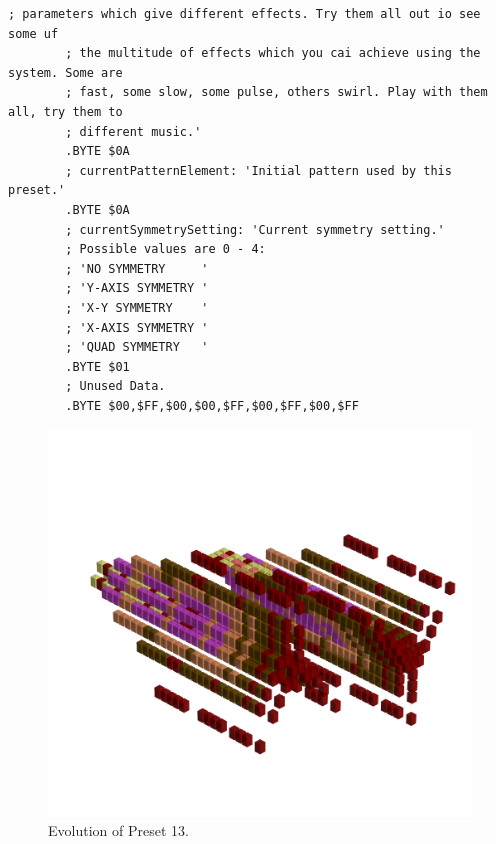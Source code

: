 \begin{lstlisting}[basicstyle=\ttfamily\tiny,caption=Source code for Preset 12.]
        ; parameters which give different effects. Try them all out io see some uf
        ; the multitude of effects which you cai achieve using the system. Some are
        ; fast, some slow, some pulse, others swirl. Play with them all, try them to
        ; different music.'
        .BYTE $0A
        ; currentPatternElement: 'Initial pattern used by this preset.'
        .BYTE $0A
        ; currentSymmetrySetting: 'Current symmetry setting.'
        ; Possible values are 0 - 4:
        ; 'NO SYMMETRY     '
        ; 'Y-AXIS SYMMETRY '
        ; 'X-Y SYMMETRY    '
        ; 'X-AXIS SYMMETRY '
        ; 'QUAD SYMMETRY   '
        .BYTE $01
        ; Unused Data.
        .BYTE $00,$FF,$00,$00,$FF,$00,$FF,$00,$FF
\end{lstlisting}


\clearpage                                                                 
\begin{figure}[H]                                                          
    \centering                                                             
    \begin{adjustbox}{width=14cm,center}                                   
      \includegraphics[width=14cm]{src/presets/pattern13-45.png}%
    \end{adjustbox}                                                        
\caption{Evolution of Preset 13.}                                           
\end{figure}                                                               
\clearpage                                                                 
                                                                           
